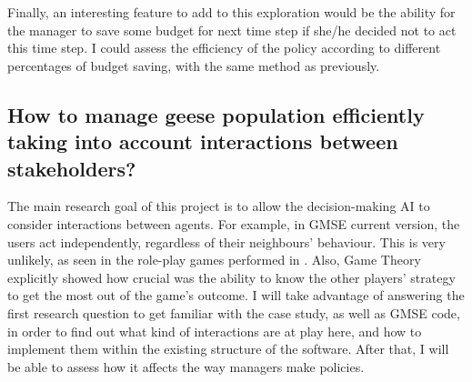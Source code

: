 \documentclass[12pt,a4paper]{article}
\begin{document}
Finally, an interesting feature to add to this exploration would be the ability for the manager to save some budget for next time step if she/he decided not to act this time step.
I could assess the efficiency of the policy according to different percentages of budget saving, with the same method as previously.

%
%

\subsection{How to manage geese population efficiently taking into account interactions between stakeholders?}

The main research goal of this project is to allow the decision-making AI to consider interactions between agents.
For example, in GMSE current version, the users act independently, regardless of their neighbours' behaviour.
This is very unlikely, as seen in the role-play games performed in \cite{redpath2018games}.
Also, Game Theory explicitly showed how crucial was the ability to know the other players' strategy to get the most out of the game's outcome.
I will take advantage of answering the first research question to get familiar with the case study, as well as GMSE code, in order to find out what kind of interactions are at play here, and how to implement them within the existing structure of the software.
After that, I will be able to assess how it affects the way managers make policies.
\end{document}
